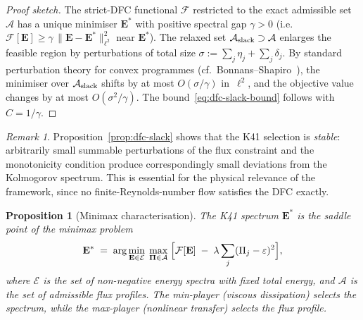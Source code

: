 \documentclass[12pt,a4paper]{article}
\theoremstyle{definition}
\theoremstyle{plain}
\newtheorem{proposition}[definition]{Proposition}
\theoremstyle{remark}
\newtheorem{remark}[definition]{Remark}
\begin{document}
\begin{proof}[Proof sketch]
The strict-DFC functional $\mathcal{F}$ restricted to the exact
admissible set $\mathcal{A}$ has a unique minimiser $\mathbf{E}^*$
with positive spectral gap $\gamma > 0$ (i.e.\
$\mathcal{F}[\mathbf{E}] \ge \gamma\,\|\mathbf{E} -
\mathbf{E}^*\|_{\ell^2}^2$ near $\mathbf{E}^*$).  The relaxed set
$\mathcal{A}_{\textup{slack}} \supset \mathcal{A}$ enlarges the
feasible region by perturbations of total size
$\sigma := \sum_j \eta_j + \sum_j \delta_j$.  By standard
perturbation theory for convex programmes (cf.\
Bonnans--Shapiro~\cite{BonnansShapiro00}), the minimiser over
$\mathcal{A}_{\textup{slack}}$ shifts by at most
$O(\sigma/\gamma)$ in~$\ell^2$, and the objective value changes by
at most $O(\sigma^2/\gamma)$.  The bound~\eqref{eq:dfc-slack-bound}
follows with $C = 1/\gamma$.
\end{proof}

\begin{remark}
Proposition~\ref{prop:dfc-slack} shows that the K41 selection is
\emph{stable}: arbitrarily small summable perturbations of the flux
constraint and the monotonicity condition produce correspondingly
small deviations from the Kolmogorov spectrum.  This is essential for
the physical relevance of the framework, since no finite-Reynolds-number
flow satisfies the DFC exactly.
\end{remark}

\begin{proposition}[Minimax characterisation]
\label{prop:minimax}
The K41 spectrum $\mathbf{E}^*$ is the saddle point of the minimax
problem
\begin{equation}\label{eq:minimax}
  \mathbf{E}^*
  \;=\;
  \arg\min_{\mathbf{E} \in \mathcal{E}}\;
  \max_{\boldsymbol{\Pi} \in \mathcal{A}}\;
  \Bigl[
    \mathcal{F}[\mathbf{E}]
    \;-\;
    \lambda \sum_j (\Pi_j - \varepsilon)^2
  \Bigr],
\end{equation}
where $\mathcal{E}$ is the set of non-negative energy spectra with
fixed total energy, and $\mathcal{A}$ is the set of admissible flux
profiles.  The min-player (viscous dissipation) selects the spectrum,
while the max-player (nonlinear transfer) selects the flux profile.
\end{proposition}
\end{document}
